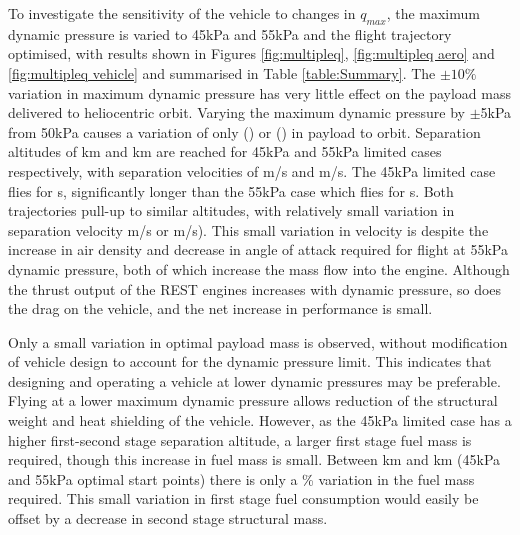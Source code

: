 To investigate the sensitivity of the vehicle to changes in $q_{max}$, the maximum dynamic pressure is varied to 45kPa and 55kPa and the flight trajectory optimised, with results shown in Figures \ref{fig:multipleq}, \ref{fig:multipleq aero} and \ref{fig:multipleq vehicle} and summarised in Table \ref{table:Summary}.
The $\pm10\%$ variation in maximum dynamic pressure has very little effect on the payload mass delivered to heliocentric orbit.  Varying the maximum dynamic pressure by $\pm$5kPa from 50kPa causes a variation of only  \qVariationPluskg (\qVariationPlus) or \qVariationMinuskg (\qVariationMinus) in payload to orbit.  
Separation altitudes of \SeparationAltFortyFivekPa km and \SeparationAltFiftyFivekPa km are reached  for 45kPa and 55kPa limited cases respectively, with separation velocities of \SeparationvFortyFivekPa m/s and \SeparationvFiftyFivekPa m/s. The 45kPa limited case flies for \FlightTimeFortyFivekPa s, significantly longer than the 55kPa case which flies for \FlightTimeFiftyFivekPa s.
Both trajectories pull-up to similar altitudes, with relatively small variation in separation velocity \vVariationMinus m/s or \vVariationPlus m/s).
This small variation in velocity is despite the increase in air density and decrease in angle of attack required for flight at 55kPa dynamic pressure, both of which increase the mass flow into the engine. Although the thrust output of the REST engines increases with dynamic pressure, so does the drag on the vehicle, and the net increase in performance is small. 


Only a small variation in optimal payload mass is observed, without modification of vehicle design to account for the dynamic pressure limit. This indicates that designing and operating a vehicle at lower dynamic pressures may be preferable. Flying at a lower maximum dynamic pressure allows reduction of the structural weight and heat shielding of the vehicle. However, as the 45kPa limited case has a higher first-second stage separation altitude, a larger first stage fuel mass is required, though this increase in fuel mass is small. Between \FirstStageAltFortyFive km  and \FirstStageAltFiftyFive km (45kPa and 55kPa optimal start points) there is only a \FirstStagemincrease \% variation in the fuel mass required. This small variation in first stage fuel consumption would easily be offset by a decrease in second stage structural mass. 


